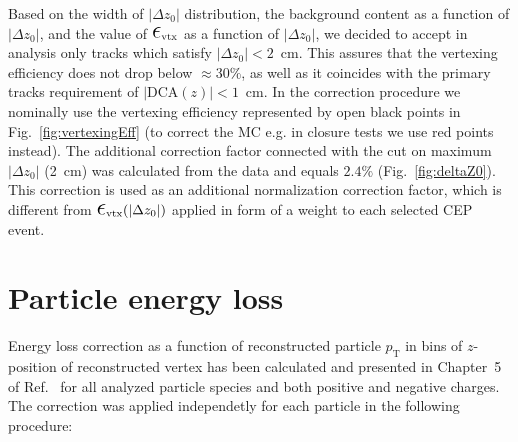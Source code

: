 Based on the width of $|\Delta z_{0}|$ distribution, the background content as a function of $|\Delta z_{0}|$, and the value of $\mbox{\LARGE$\epsilon$}_{\text{vtx}}$ as a function of $|\Delta z_{0}|$, we decided to accept in analysis only tracks which satisfy $|\Delta z_{0}|<2$~cm. This assures that the vertexing efficiency does not drop below $\approx 30\%$, as well as it coincides with the primary tracks requirement of $|\text{DCA}(z)|<1$~cm. In the correction procedure we nominally use the vertexing efficiency represented by open black points in Fig.~\ref{fig:vertexingEff} (to correct the MC e.g. in closure tests we use red points instead). The additional correction factor connected with the cut on maximum $|\Delta z_{0}|$ (2~cm) was calculated from the data and equals $2.4\%$ (Fig.~\ref{fig:deltaZ0}). This correction is used as an additional normalization correction factor, which is different from $\mbox{\LARGE$\epsilon$}_{\text{vtx}}(|\Delta z_{0}|)$ applied in form of a weight to each selected CEP event.


\section{Particle energy loss}\label{sec:energyLoss}

Energy loss correction as a function of reconstructed particle $p_{\text{T}}$ in bins of $z$-position of reconstructed vertex has been calculated and presented in Chapter~5 of Ref.~\cite{supplementaryNote} for all analyzed particle species and both positive and negative charges. The correction was applied independetly for each particle in the following procedure:

